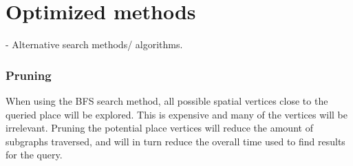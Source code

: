
\chapter{Optimized methods}

- Alternative search methods/ algorithms.\\

\subsection{Pruning}
When using the BFS search method, all possible spatial vertices close to the queried place will be explored. This is expensive and many of the vertices will be irrelevant. Pruning the potential place vertices will reduce the amount of subgraphs traversed, and will in turn reduce the overall time used to find results for the query.

\clearpage